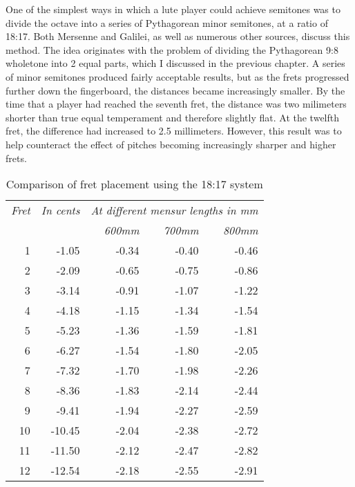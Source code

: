 One of the simplest ways in which a lute player could achieve
semitones was to divide the octave into a series of Pythagorean minor semitones, at a ratio of
18:17.  Both Mersenne and Galilei, as well as numerous other sources, discuss this method.  The
idea originates with the problem of dividing the Pythagorean 9:8 wholetone into 2 equal parts,
which I discussed in the previous chapter.  A series of minor semitones produced fairly
acceptable results, but as the frets progressed further down the fingerboard, the distances
became increasingly smaller.  By the time that a player had reached the seventh fret, the distance
was two milimeters shorter than true equal temperament and therefore slightly flat.  At the
twelfth fret, the difference had increased to 2.5 millimeters.  However, this result was
to help counteract the effect of pitches becoming increasingly sharper and higher frets.

\begin{table}[h!]
    \begin{center}
    \begin{tabular}{ r r| r r r }
      \textit{Fret} & \textit{In cents} & \multicolumn{3}{c}{\textit{At different mensur lengths in mm}} \\
       &  & \textit{600mm} & \textit{700mm} & \textit{800mm} \\
      \hline
      1  & -1.05  & -0.34 & -0.40 & -0.46 \\
      2  & -2.09  & -0.65 & -0.75 & -0.86 \\
      3  & -3.14  & -0.91 & -1.07 & -1.22 \\
      4  & -4.18  & -1.15 & -1.34 & -1.54 \\
      5  & -5.23  & -1.36 & -1.59 & -1.81 \\
      6  & -6.27  & -1.54 & -1.80 & -2.05 \\
      7  & -7.32  & -1.70 & -1.98 & -2.26 \\
      8  & -8.36  & -1.83 & -2.14 & -2.44 \\
      9  & -9.41  & -1.94 & -2.27 & -2.59 \\
      10 & -10.45 & -2.04 & -2.38 & -2.72 \\
      11 & -11.50 & -2.12 & -2.47 & -2.82 \\
      12 & -12.54 & -2.18 & -2.55 & -2.91 \\
    \end{tabular}
    \end{center}
    \caption{Comparison of fret placement using the 18:17 system}
    \label{18:17rule}
\end{table}


